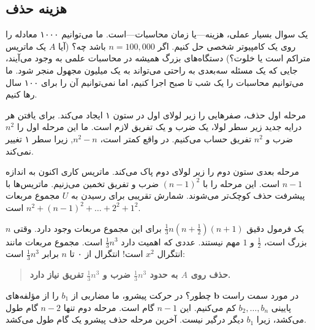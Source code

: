 \documentclass[12pt, a4paper]{book}
\begin{document}
	\subsection*{هزینه حذف}
	یک سوال بسیار عملی، هزینه—یا زمان محاسبات—است. ما می‌توانیم ۱۰۰۰ معادله را روی یک کامپیوتر شخصی حل کنیم. اگر $n=100,000$ باشد چه؟ (آیا $A$ یک ماتریس متراکم است یا خلوت؟) دستگاه‌های بزرگ همیشه در محاسبات علمی به وجود می‌آیند، جایی که یک مسئله سه‌بعدی به راحتی می‌تواند به یک میلیون مجهول منجر شود. ما می‌توانیم محاسبات را یک شب تا صبح اجرا کنیم، اما نمی‌توانیم آن را برای ۱۰۰ سال رها کنیم.
	
	مرحله اول حذف، صفرهایی را زیر لولای اول در ستون ۱ ایجاد می‌کند. برای یافتن هر درایه جدید زیر سطر لولا، یک ضرب و یک تفریق لازم است. ما این مرحله اول را $n^2$ ضرب و $n^2$ تفریق حساب می‌کنیم. در واقع کمتر است، $n^2-n$, زیرا سطر ۱ تغییر نمی‌کند.
	
	مرحله بعدی ستون دوم را زیر لولای دوم پاک می‌کند. ماتریس کاری اکنون به اندازه $n-1$ است. این مرحله را با $(n-1)^2$ ضرب و تفریق تخمین می‌زنیم. ماتریس‌ها با پیشرفت حذف کوچک‌تر می‌شوند. شمارش تقریبی برای رسیدن به $U$ مجموع مربعات $n^2+(n-1)^2+\dots+2^2+1^2$ است.
	
	یک فرمول دقیق $\frac{1}{3}n(n+\frac{1}{2})(n+1)$ برای این مجموع مربعات وجود دارد. وقتی $n$ بزرگ است، $\frac{1}{2}$ و $1$ مهم نیستند. عددی که اهمیت دارد $\frac{1}{3}n^3$ است. مجموع مربعات مانند انتگرال $x^2$ است! انتگرال از ۰ تا $n$ برابر $\frac{1}{3}n^3$ است:
	\begin{quote}
		\textbf{حذف روی $A$ به حدود $\frac{1}{3}n^3$ ضرب و $\frac{1}{3}n^3$ تفریق نیاز دارد.}
	\end{quote}
	در مورد سمت راست $\mathbf{b}$ چطور؟ در حرکت پیشرو، ما مضاربی از $b_1$ را از مؤلفه‌های پایینی $b_2, \dots, b_n$ کم می‌کنیم. این $n-1$ گام است. مرحله دوم تنها $n-2$ گام طول می‌کشد، زیرا $b_1$ دیگر درگیر نیست. آخرین مرحله حذف پیشرو یک گام طول می‌کشد.
	
\end{document}
